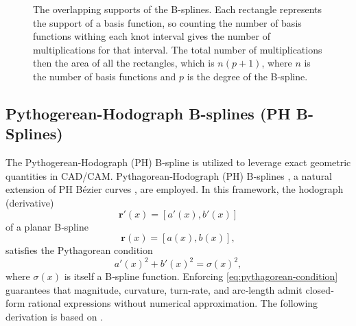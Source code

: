 \begin{figure}
    \centering
    
    \caption{The overlapping supports of the B-splines. Each rectangle represents the support of a basis function, so counting the number of basis functions withing each knot interval gives the number of multiplications for that interval. The total number of multiplications then the area of all the rectangles, which is $n(p+1)$, where $n$ is the number of basis functions and $p$ is the degree of the B-spline.}
    \label{fig:overlapping-bases}
\end{figure}


\subsection{Pythogerean-Hodograph B-splines (PH B-Splines)}\label{sec:pythogerean-hodograph}
The Pythogerean-Hodograph (PH) B-spline is utilized to leverage exact geometric quantities in CAD/CAM. Pythagorean‐Hodograph (PH) B‐splines \cite{Albrecht2016}, a natural extension of PH Bézier curves \cite{Farouki1990}, are employed. In this framework, the hodograph (derivative) 
\begin{equation*}
    \mathbf r'(x) = [a'(x), b'(x)]
\end{equation*}
of a planar B‐spline
\begin{equation*}
    \mathbf r(x) = [a(x), b(x)],
\end{equation*}
satisfies the Pythagorean condition
\begin{equation}\label{eq:pythagorean-condition}
a'(x)^2 + b'(x)^2 = \sigma(x)^2,
\end{equation}
where $\sigma(x)$ is itself a B‐spline function. Enforcing \cref{eq:pythagorean-condition} guarantees that magnitude, curvature, turn‐rate, and arc‐length admit closed‐form rational expressions without numerical approximation. The following derivation is based on \cite{Albrecht2016}.

